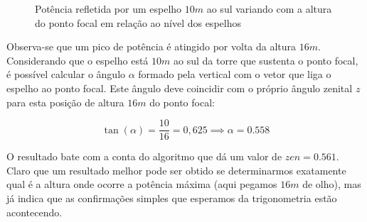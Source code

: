 \documentclass[a4paper,12pt]{article}
\begin{document}
\bigskip
\bigskip
\bigskip

\begin{figure}[!htb]
	\centering 
	\caption{Potência refletida por um espelho $10m$ ao sul variando com a altura do ponto focal em relação ao nível dos espelhos} 
\end{figure}

Observa-se que um pico de potência é atingido por volta da altura $16m$.
Considerando que o espelho está $10m$ ao sul da torre que sustenta o ponto
focal, é possível calcular o ângulo $\alpha$ formado pela vertical com o vetor que liga
o espelho ao ponto focal. Este ângulo deve coincidir com o próprio ângulo
zenital $z$ para esta posição de altura $16m$ do ponto focal:

\begin{equation}
	\tan(\alpha) = \frac{10}{16} = 0,625 \implies \alpha = 0.558
\end{equation}

O resultado bate com a conta do algoritmo que dá um valor de $ zen = 0.561$.
Claro que um resultado melhor pode ser obtido se determinarmos exatamente qual
é a altura onde ocorre a potência máxima (aqui pegamos $16m$ de olho), mas já indica 
que as confirmações simples que esperamos da trigonometria estão acontecendo.
\end{document}
